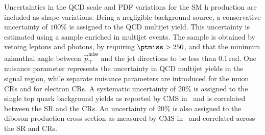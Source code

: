 Uncertainties in the QCD scale and PDF variations for the SM h production are included as shape variations. Being a negligible background source, a conservative uncertainty of $100\%$ is assigned to the QCD multijet yield. This uncertainty is estimated using a sample enriched in multijet events. The sample is obtained by vetoing leptons and photons, by requiring $\ptmiss>250$\GeV, and that the minimum azimuthal angle between $\vec{p}_{\mathrm{T}}^{\mathrm{miss}}$ and the jet directions to be less than $0.1$\,rad. One nuisance parameter represents the uncertainty in QCD multijet yields in the signal region, while separate nuisance parameters are introduced for the muon CRs and for electron CRs. A systematic uncertainty of $20\%$ is assigned to the single top quark background yields as reported by CMS in~\cite{Chatrchyan:1642680} and is correlated between the SR and the CRs. An uncertainty of $20\%$ is also assigned to the diboson production cross section as measured by CMS in~\cite{Khachatryan:2016txa,Khachatryan:2016tgp} and correlated across the SR and CRs.




